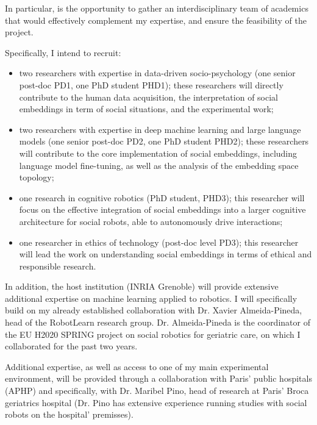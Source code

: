 In particular, \project is the opportunity to gather an interdisciplinary team
of academics that would effectively complement my expertise, and ensure the
feasibility of the project.

Specifically, I intend to recruit:

\begin{itemize}

    \item  two researchers with expertise in data-driven
        socio-psychology (one senior post-doc PD1, one PhD student PHD1); these
        researchers will directly contribute to the human data acquisition,
        the interpretation of social embeddings in term of social situations,
        and the experimental work;

    \item two researchers with expertise in deep machine learning and large
        language models (one senior post-doc PD2, one PhD student PHD2); these
        researchers will contribute to the core implementation of social
        embeddings, including language model fine-tuning, as well as the
        analysis of the embedding space topology;

    \item one research in cognitive robotics (PhD student, PHD3); this
        researcher will focus on the effective integration of social
        embeddings into a larger cognitive architecture for social robots, able
        to autonomously drive interactions;

    \item one researcher in ethics of technology (post-doc
        level PD3); this researcher will lead the work on understanding social
        embeddings in terms of ethical and responsible research.
\end{itemize}

In addition, the host institution (INRIA Grenoble) will provide extensive
additional expertise on machine learning applied to robotics. I will specifically build on
my already established collaboration with Dr. Xavier Almeida-Pineda, head of the
RobotLearn research group. Dr. Almeida-Pineda is the coordinator of the EU H2020
SPRING project on social robotics for geriatric care, on which I collaborated
for the past two years.

Additional expertise, as well as access to one of my main experimental
environment, will be provided through a collaboration with Paris' public
hospitals (APHP) and specifically, with Dr. Maribel Pino, head of research at
Paris' Broca geriatrics hospital (Dr. Pino has extensive experience running
studies with social robots on the hospital' premisses).

